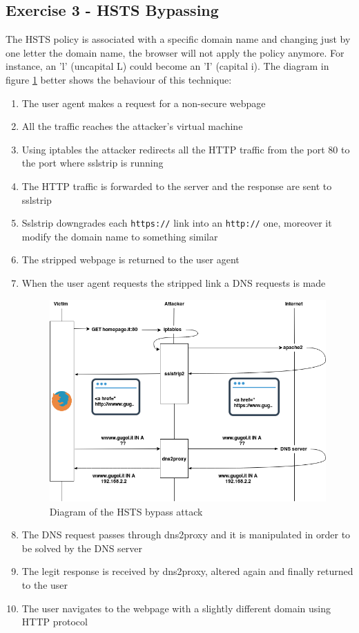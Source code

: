 \documentclass[final]{article}
\begin{document}
\subsection{Exercise 3 - HSTS Bypassing}
The HSTS policy is associated with a specific domain name and changing just by one letter the domain name, the browser will
not apply the policy anymore. For instance, an ’l’ (uncapital L) could become an ’I’ (capital i).
The diagram in figure \ref{hsts_bypass} better shows the behaviour of this technique:
\begin{enumerate}
  \item The user agent makes a request for a non-secure webpage
  \item All the traffic reaches the attacker's virtual machine
  \item Using iptables the attacker redirects all the HTTP traffic from the port 80 to the port where sslstrip is running
  \item The HTTP traffic is forwarded to the server and the response are sent to sslstrip
  \item Sslstrip downgrades each \texttt{https://} link into an \texttt{http://} one, moreover it modify the domain name to something similar
  \item The stripped webpage is returned to the user agent
  \item When the user agent requests the stripped link a DNS requests is made
  \begin{figure}[h]
    \center
    \includegraphics[width=\textwidth]{../figures/hsts_bypass_time}
    \caption{Diagram of the HSTS bypass attack}
    \label{hsts_bypass}
  \end{figure}
  \item The DNS request passes through dns2proxy and it is manipulated in order to be solved by the DNS server
  \item The legit response is received by dns2proxy, altered again and finally returned to the user
  \item The user navigates to the webpage with a slightly different domain using HTTP protocol
\end{enumerate}
\end{document}
